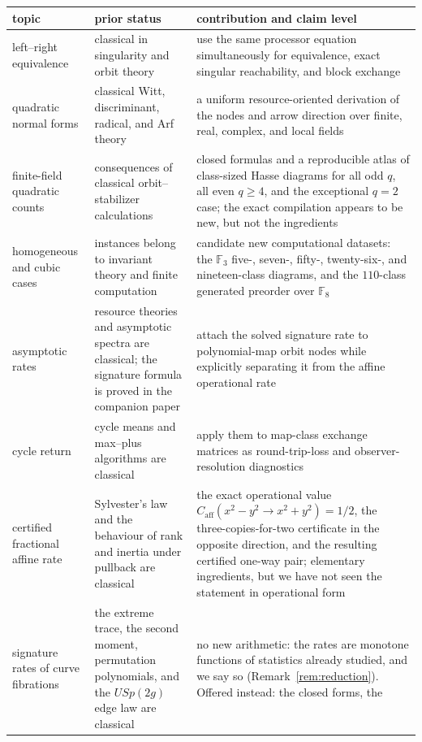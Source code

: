 \documentclass[11pt]{article}
\theoremstyle{definition}
\theoremstyle{plain}
\theoremstyle{remark}
\newcommand{\F}{\mathbb F}
\newcommand{\caff}{C_{\mathrm{aff}}}
\begin{document}
\begin{center}
\begin{tabular}{@{}p{}p{}p{}@{}}
\toprule
topic & prior status & contribution and claim level\\
\midrule
left--right equivalence & classical in singularity and orbit theory & use
the same processor equation simultaneously for equivalence, exact singular
reachability, and block exchange\\[2pt]
quadratic normal forms & classical Witt, discriminant, radical, and Arf theory
& a uniform resource-oriented derivation of the nodes and arrow direction
over finite, real, complex, and local fields\\[2pt]
finite-field quadratic counts & consequences of classical orbit--stabilizer
calculations & closed formulas and a reproducible atlas of class-sized Hasse
diagrams for all odd \(q\), all even \(q\ge4\), and the exceptional \(q=2\)
case; the exact compilation appears to be new, but not the ingredients\\[2pt]
homogeneous and cubic cases & instances belong to invariant theory and
finite computation & candidate new computational datasets: the \(\F_3\)
five-, seven-, fifty-, twenty-six-, and nineteen-class diagrams, and the
\(110\)-class generated preorder over \(\F_8\)\\[2pt]
asymptotic rates & resource theories and asymptotic spectra are classical;
the signature formula is proved in the companion paper & attach the solved
signature rate to polynomial-map orbit nodes while explicitly separating it
from the affine operational rate\\[2pt]
cycle return & cycle means and max--plus algorithms are classical & apply them
to map-class exchange matrices as round-trip-loss and observer-resolution
diagnostics\\[2pt]
certified fractional affine rate & Sylvester's law and the behaviour of rank
and inertia under pullback are classical & the exact operational value
\(\caff(x^2-y^2\to x^2+y^2)=1/2\), the three-copies-for-two certificate in
the opposite direction, and the resulting certified one-way pair; elementary
ingredients, but we have not seen the statement in operational form\\[2pt]
signature rates of curve fibrations & the extreme trace, the second moment,
permutation polynomials, and the \(USp(2g)\) edge law are classical & no new
arithmetic: the rates are monotone functions of statistics already studied, and
we say so (Remark~\ref{rem:reduction}).  Offered instead: the closed forms, the

\end{tabular}
\end{center}
\end{document}

